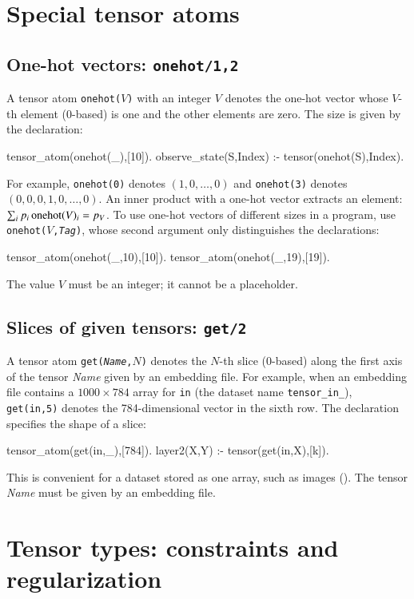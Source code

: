 \documentclass[a4paper]{report}
\begin{document}
\section{Special tensor atoms}
\label{sec:special_tensor}

\subsection*{One-hot vectors: {\tt onehot/1,2}}
A tensor atom {\tt onehot($V$)} with an integer $V$ denotes the one-hot
vector whose $V$-th element (0-based) is one and the other elements are zero.
The size is given by the declaration:
\begin{prologcode}
tensor_atom(onehot(_),[10]).
observe_state(S,Index) :- tensor(onehot(S),Index).
\end{prologcode}
For example, {\tt onehot(0)} denotes $(1,0,\ldots,0)$ and {\tt onehot(3)}
denotes $(0,0,0,1,0,\ldots,0)$.  An inner product with a one-hot vector
extracts an element: $\sum_i p_i\,{\rm onehot}(V)_i=p_V$.  To use one-hot
vectors of different sizes in a program, use {\tt onehot($V$,{\it Tag})},
whose second argument only distinguishes the declarations:
\begin{prologcode}
tensor_atom(onehot(_,10),[10]).
tensor_atom(onehot(_,19),[19]).
\end{prologcode}
The value $V$ must be an integer; it cannot be a placeholder.

\subsection*{Slices of given tensors: {\tt get/2}}
A tensor atom {\tt get({\it Name},$N$)} denotes the $N$-th slice (0-based)
along the first axis of the tensor {\it Name} given by an embedding
file.  For example, when an embedding file contains a $1000\times 784$
array for {\tt in} (the dataset name {\tt tensor\_in\_}), {\tt
	get(in,5)} denotes the 784-dimensional vector in the sixth row.  The
declaration specifies the shape of a slice:
\begin{prologcode}
tensor_atom(get(in,_),[784]).
layer2(X,Y) :- tensor(get(in,X),[k]).
\end{prologcode}
This is convenient for a dataset stored as one array, such as images
().  The tensor {\it Name} must be given by an
embedding file.

\section{Tensor types: constraints and regularization}
\label{sec:tensor_type}
\end{document}
